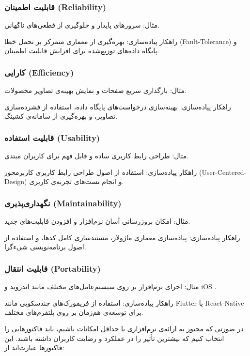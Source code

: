 \subsubsection*{قابلیت اطمینان (Reliability)}
{مثال:} سرورهای پایدار و جلوگیری از قطعی‌های ناگهانی.

{راهکار پیاده‌سازی:} بهره‌گیری از معماری متمرکز بر تحمل خطا (Fault-Tolerance) و پایگاه داده‌های توزیع‌شده برای افزایش قابلیت اطمینان.

\subsubsection*{کارایی (Efficiency)}
{مثال:} بارگذاری سریع صفحات و نمایش بهینه‌ی تصاویر محصولات.

{راهکار پیاده‌سازی:} بهینه‌سازی درخواست‌های پایگاه داده، استفاده از فشرده‌سازی تصاویر، و بهره‌گیری از سامانه‌ی کشینگ.

\subsubsection*{قابلیت استفاده (Usability)}
{مثال:} طراحی رابط کاربری ساده و قابل فهم برای کاربران مبتدی.

{راهکار پیاده‌سازی:} استفاده از اصول طراحی رابط کاربری کاربرمحور (User-Centered-Design) و انجام تست‌های تجربه‌ی کاربری.

\subsubsection*{نگهداری‌پذیری (Maintainability)}
{مثال:} امکان بروزرسانی آسان نرم‌افزار و افزودن قابلیت‌های جدید.

{راهکار پیاده‌سازی:} پیاده‌سازی معماری ماژولار، مستندسازی کامل کدها، و استفاده از اصول برنامه‌نویسی شیءگرا.

\subsubsection*{قابلیت انتقال (Portability)}
{مثال:} اجرای نرم‌افزار بر روی سیستم‌عامل‌های مختلف مانند اندروید و iOS .

{راهکار پیاده‌سازی:} استفاده از فریمورک‌های چندسکویی مانند Flutter یا React-Native برای توسعه‌ی هم‌زمان بر روی پلتفرم‌های مختلف.

\pagebreak

در صورتی که مجبور به ارائه‌ی نرم‌افزاری با حداقل امکانات باشیم، باید فاکتورهایی را انتخاب کنیم که بیشترین تأثیر را در عملکرد و رضایت کاربران داشته باشند. این فاکتورها عبارت‌اند از:

